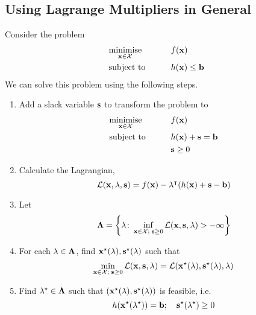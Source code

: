 \subsection{Using Lagrange Multipliers in General}
Consider the problem
\begin{alignat*}{2}
    &\underset{\vb x \in \mathcal X}{\text{minimise}}        &\qquad& f(\vb x)\\
    &\text{subject to} &      & h(\vb x) \leq \vb b
    \end{alignat*}
We can solve this problem using the following steps.
\begin{enumerate}[(1)]
    \item Add a slack variable \(\vb s\) to transform the problem to
    \begin{alignat*}{2}
        &\underset{\vb x \in \mathcal X}{\text{minimise}}        &\qquad& f(\vb x)\\
        &\text{subject to} &      & h(\vb x) + \vb s = \vb b\\
        & & & \vb s \geq 0
        \end{alignat*}
    \item Calculate the Lagrangian,
    \[ \mathcal L(\vb x, \vb \lambda, \vb s) = f(\vb x) - \vb \lambda^\intercal (h(\vb x) + \vb s - \vb b) \]
    \item Let 
    \[ \vb \Lambda = \qty{\vb \lambda \colon \inf_{\vb x \in \mathcal X;\; \vb s \geq 0} \mathcal L(\vb x, \vb s, \vb \lambda) > -\infty} \]
    \item For each \(\vb\lambda \in \vb\Lambda\), find \(\vb x^\star(\vb \lambda), \vb s^\star(\vb \lambda)\) such that
    \[ \min_{\vb x \in \mathcal X;\; \vb s \geq 0} \mathcal L(\vb x, \vb s, \vb \lambda) = \mathcal L(\vb x^\star(\vb \lambda), \vb s^\star(\vb \lambda), \vb \lambda) \]
    \item Find \(\vb\lambda^\star \in \vb\Lambda\) such that \((\vb x^\star(\vb \lambda), \vb s^\star(\vb \lambda))\) is feasible, i.e.
    \[ h(\vb x^\star(\vb \lambda^\star)) = \vb b;\quad \vb s^\star (\vb \lambda^\star) \geq 0 \]
\end{enumerate}

